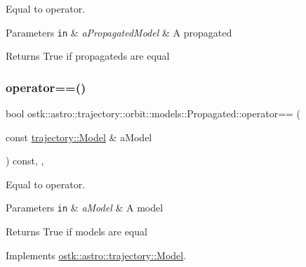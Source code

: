 Equal to operator. 


\begin{DoxyParams}[1]{Parameters}
\mbox{\tt in}  & {\em a\+Propagated\+Model} & A propagated \\
\hline
\end{DoxyParams}
\begin{DoxyReturn}{Returns}
True if propagateds are equal 
\end{DoxyReturn}
\mbox{\label{classostk_1_1astro_1_1trajectory_1_1orbit_1_1models_1_1_propagated_a29b52ccf653fbd84699edab0f198f590}} 
\subsubsection{\texorpdfstring{operator==()}{operator==()}\hspace{0.1cm}{\footnotesize\ttfamily [2/2]}}
{\footnotesize\ttfamily bool ostk\+::astro\+::trajectory\+::orbit\+::models\+::\+Propagated\+::operator== (\begin{DoxyParamCaption}\item[{const \hyperlink{classostk_1_1astro_1_1trajectory_1_1_model}{trajectory\+::\+Model} \&}]{a\+Model }\end{DoxyParamCaption}) const\hspace{0.3cm}{\ttfamily [override]}, {\ttfamily [protected]}, {\ttfamily [virtual]}}



Equal to operator. 


\begin{DoxyParams}[1]{Parameters}
\mbox{\tt in}  & {\em a\+Model} & A model \\
\hline
\end{DoxyParams}
\begin{DoxyReturn}{Returns}
True if models are equal 
\end{DoxyReturn}


Implements \hyperlink{classostk_1_1astro_1_1trajectory_1_1_model_a874f79846e845859c070ce1b9874fc9c}{ostk\+::astro\+::trajectory\+::\+Model}.

\mbox{\label{classostk_1_1astro_1_1trajectory_1_1orbit_1_1models_1_1_propagated_a2b8aa6ff5511dbe92e6a3e7f4dd6880b}} 

